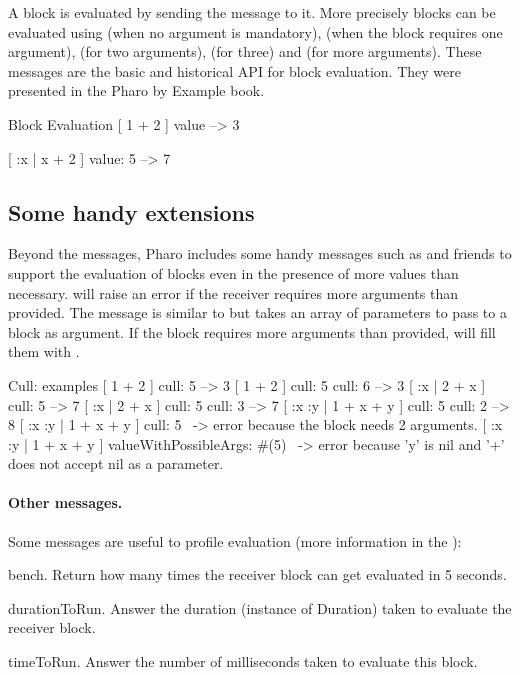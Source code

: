 \documentclass[a4paper,10pt,twoside]{book}
\begin{document}
 A block is evaluated by sending the  message to it. More precisely blocks can be evaluated using  (when no argument is mandatory),  (when the block requires one argument),  (for two arguments),  (for three) and  (for more arguments). These messages are the basic and historical API for block evaluation. They were presented in the Pharo by Example book.

\begin{code}{Block Evaluation}
[ 1 + 2 ] value --> 3

[ :x | x + 2 ] value: 5 --> 7
\end{code}

\subsection{Some handy extensions}

Beyond the  messages, Pharo includes some handy messages
such as  and friends to support the evaluation of blocks even
in the presence of more values than necessary.  will raise
an error if the receiver requires more arguments than provided. The
 message is similar to  but takes
an array of parameters to pass to a block as argument. If the block
requires more arguments than provided, 
will fill them with .

\begin{code}{Cull: examples}
[ 1 + 2 ] cull: 5 --> 3
[ 1 + 2 ] cull: 5 cull: 6 --> 3
[ :x | 2 + x ] cull: 5 --> 7
[ :x | 2 + x ] cull: 5 cull: 3 --> 7
[ :x :y | 1 + x + y ] cull: 5 cull: 2 --> 8
[ :x :y | 1 + x + y ] cull: 5 ~-> error because the block needs 2 arguments.
[ :x :y | 1 + x + y ] valueWithPossibleArgs: #(5)
                      ~-> error because 'y' is nil and '+' does not accept nil as a parameter.
\end{code}


\paragraph{Other messages.}

Some messages are useful to profile evaluation (more information in the ):

\begin{description}
\item{\textsf{bench}}. Return how many times the receiver block can get evaluated in 5 seconds.

\item{\textsf{durationToRun}}. Answer the duration (instance of Duration) taken to evaluate the receiver block.

\item{\textsf{timeToRun}}. Answer the number of milliseconds taken to evaluate this block.
\end{description}
\end{document}
